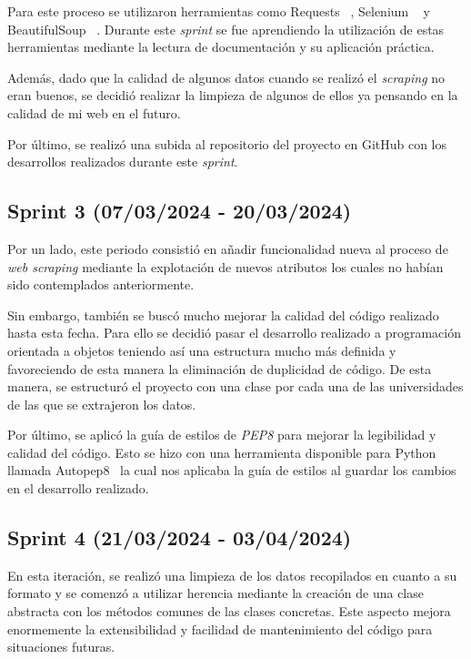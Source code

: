 Para este proceso se utilizaron herramientas como Requests ~\cite{requests:latex}, Selenium ~\cite{selenium:latex} y BeautifulSoup ~\cite{beautifulsoup:latex}. Durante este \textit{sprint} se fue aprendiendo la utilización de estas herramientas mediante la lectura de documentación y su aplicación práctica.

Además, dado que la calidad de algunos datos cuando se realizó el \textit{scraping} no eran buenos, se decidió realizar la limpieza de algunos de ellos ya pensando en la calidad de mi web en el futuro.

Por último, se realizó una subida al repositorio del proyecto en GitHub con los desarrollos realizados durante este \textit{sprint}.


\subsection{Sprint 3 (07/03/2024 -
20/03/2024)}
Por un lado, este periodo consistió en añadir funcionalidad nueva al proceso de \textit{web scraping} mediante la explotación de nuevos atributos los cuales no habían sido contemplados anteriormente.

Sin embargo, también se buscó mucho mejorar la calidad del código realizado hasta esta fecha. Para ello se decidió pasar el desarrollo realizado a programación orientada a objetos teniendo así una estructura mucho más definida y favoreciendo de esta manera la eliminación de duplicidad de código. De esta manera, se estructuró el proyecto con una clase por cada una de las universidades de las que se extrajeron los datos.

Por último, se aplicó la guía de estilos de \textit{PEP8}  para mejorar la legibilidad y calidad del código. Esto se hizo con una herramienta disponible para Python llamada Autopep8~\cite{autopep8:latex} la cual nos aplicaba la guía de estilos al guardar los cambios en el desarrollo realizado.


\subsection{Sprint 4 (21/03/2024 -
03/04/2024)}
En esta iteración, se realizó una limpieza de los datos recopilados en cuanto a su formato y se comenzó a utilizar herencia mediante la creación de una clase abstracta con los métodos comunes de las clases concretas. Este aspecto mejora enormemente la extensibilidad y facilidad de mantenimiento del código para situaciones futuras.

